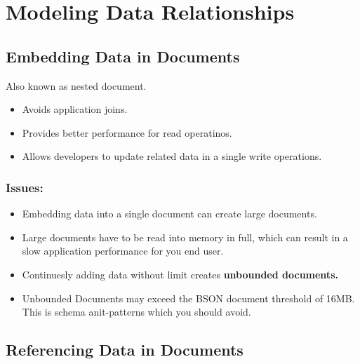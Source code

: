 \documentclass[../main.tex]{subfiles}
\begin{document}
\section{Modeling Data Relationships}
\subsection{Embedding Data in Documents}
Also known as nested document.
\begin{itemize}
	\item Avoids application joins. 
	\item Provides better performance for read operatinos.
	\item Allows developers to update related data in a single write operations.
\end{itemize}
\subsubsection {Issues:}

\begin{itemize}
	\item Embedding data into a single document can create large documents.
	\item{Large documents have to be read into memory in full, which can result in a slow application performance for you end user.}
	\item{Continuesly adding data without limit creates \textbf{unbounded documents.}}
	\item{Unbounded Documents may exceed the \gls{BSON} document threshold of 16MB. This is schema anit-patterns which you should avoid.}
\end{itemize}

\subsection{Referencing Data in Documents}
\printglossaries
\end{document}

